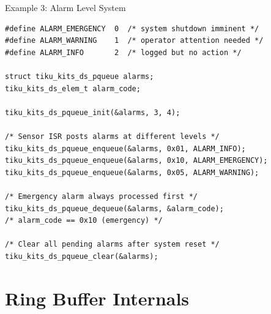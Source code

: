 \documentclass[aspectratio=169, 10pt]{beamer}
\begin{document}
\begin{frame}[fragile]{Example 3: Alarm Level System}
\begin{lstlisting}[style=cstyle,
  title={Multi-level alarm processing}]
#define ALARM_EMERGENCY  0  /* system shutdown imminent */
#define ALARM_WARNING    1  /* operator attention needed */
#define ALARM_INFO       2  /* logged but no action */

struct tiku_kits_ds_pqueue alarms;
tiku_kits_ds_elem_t alarm_code;

tiku_kits_ds_pqueue_init(&alarms, 3, 4);

/* Sensor ISR posts alarms at different levels */
tiku_kits_ds_pqueue_enqueue(&alarms, 0x01, ALARM_INFO);
tiku_kits_ds_pqueue_enqueue(&alarms, 0x10, ALARM_EMERGENCY);
tiku_kits_ds_pqueue_enqueue(&alarms, 0x05, ALARM_WARNING);

/* Emergency alarm always processed first */
tiku_kits_ds_pqueue_dequeue(&alarms, &alarm_code);
/* alarm_code == 0x10 (emergency) */

/* Clear all pending alarms after system reset */
tiku_kits_ds_pqueue_clear(&alarms);
\end{lstlisting}
\end{frame}

\section{Ring Buffer Internals}
\end{document}
